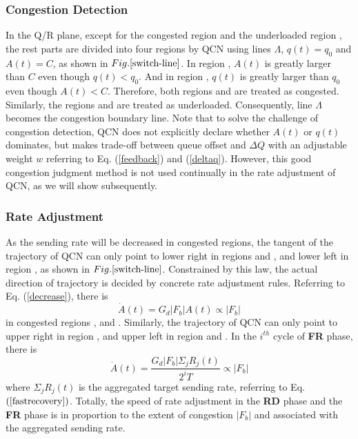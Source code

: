 \documentclass{sig-alternate-10pt}
\def\figurename{Fig.}
\begin{document}
\subsubsection{Congestion Detection}
In the Q/R plane, except for the congested region  and the underloaded region , the rest parts are divided into four regions by QCN using lines $\Lambda$, $q(t)=q_0$ and $A(t)=C$, as shown in $\figurename{\ref{switch-line}}$. In region , $A(t)$ is greatly larger than $C$ even though $q(t)<q_0$. And in region , $q(t)$ is greatly larger than $q_0$ even though $A(t)<C$. Therefore, both regions  and  are treated as congested. Similarly, the regions  and  are treated as underloaded. Consequently, line $\Lambda$ becomes the congestion boundary line. Note that to solve the challenge of congestion detection, QCN does not explicitly declare whether $A(t)$ or $q(t)$ dominates, but makes trade-off between queue offset and $\Delta Q$ with an adjustable weight $w$ referring to Eq. (\ref{feedback}) and (\ref{deltaq}). However, this good congestion judgment method is not used continually in the rate adjustment of QCN, as we will show subsequently.  



\subsubsection{Rate Adjustment}
As the sending rate will be decreased in congested regions, the tangent of the trajectory of QCN can only point to lower right in regions  and , and lower left in region , as shown in $\figurename{\ref{switch-line}}$. Constrained by this law, the actual direction of trajectory is decided by concrete rate adjustment rules. Referring to Eq. (\ref{decrease}), there is
\begin{equation}
\dot{A}(t)=G_d|F_b|A(t)\propto |F_b|
\label{decrease-slope}
\end{equation}
in congested regions , and . Similarly, the trajectory of QCN can only point to upper right in region , and upper left in region  and . In the $i^{th}$ cycle of \textbf{FR} phase, there is
\begin{equation}
\dot{A}(t)=\frac{G_d|F_b|\Sigma_j R_j(t)}{2^iT} \propto |F_b|
\label{increase-slope}
\end{equation}
where $\Sigma_j R_j(t)$ is the aggregated target sending rate, referring to Eq. $(\ref{fastrecovery})$. Totally, the speed of rate adjustment in the \textbf{RD} phase and the \textbf{FR} phase is in proportion to the extent of congestion $|F_b|$ and associated with the aggregated sending rate.
\end{document}
